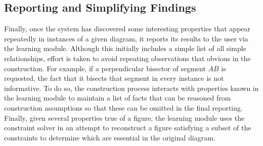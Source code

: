 \subsection{Reporting and Simplifying Findings}

Finally, once the system has discovered some interesting properties
that appear repeatedly in instances of a given diagram, it reports its
results to the user via the learning module.  Although this initially
includes a simple list of all simple relationships, effort is taken to
avoid repeating observations that obvious in the construction.  For
example, if a perpendicular bisector of segment $AB$ is requested, the
fact that it bisects that segment in every instance is not
informative.  To do so, the construction process interacts with
properties known in the learning module to maintain a list of facts
that can be reasoned from construction assumptions so that these can
be omitted in the final reporting. Finally, given several properties
true of a figure, the learning module uses the constraint solver in an
attempt to reconstruct a figure satisfying a subset of the constraints
to determine which are essential in the original diagram.
